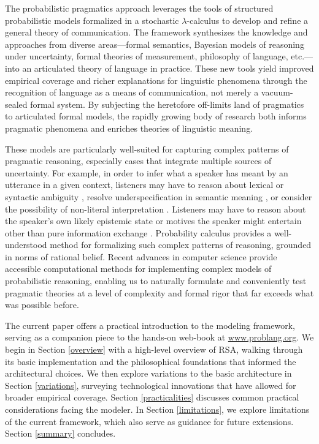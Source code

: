 \documentclass{sp}
\newcommand{\gcs}[1]{\textcolor{blue}{[gcs: #1]}}
\newcommand{\mht}[1]{\textcolor{purple}{[mht: #1]}}
\begin{document}
The probabilistic pragmatics approach leverages the tools of structured probabilistic models formalized in a stochastic $\lambda$-calculus to develop and refine a general theory of communication. The framework synthesizes the knowledge and approaches from diverse areas---formal semantics, Bayesian models of reasoning under uncertainty, formal theories of measurement, philosophy of language, etc.---into an articulated theory of language in practice. These new tools yield improved 
empirical coverage and richer explanations for linguistic phenomena through the recognition of language as a means of communication, not merely a vacuum-sealed formal system. By subjecting the heretofore off-limits land of pragmatics to articulated formal models, the rapidly growing body of research both informs pragmatic phenomena and enriches theories of linguistic meaning.


These models are particularly well-suited for capturing complex patterns of pragmatic reasoning, especially cases that integrate multiple sources of uncertainty. For example, in order to infer what a speaker has meant by an utterance in a given context, listeners may have to reason about lexical or syntactic ambiguity \citep{bergenetal2016,savinellietal2017}, resolve underspecification in semantic meaning \citep{lassitergoodman2013}, or consider the possibility of non-literal interpretation \citep{kaoetal2014}. Listeners may have to reason about the speaker's own likely epistemic state \citep{goodmanstuhlmuller2013,scontrasgoodman2017} or motives the speaker might entertain other than pure  information exchange \citep{yoonetal2016,yoonetal2017}. Probability calculus provides a well-understood method for formalizing such complex patterns of reasoning, grounded in norms of rational belief. Recent advances in computer science provide accessible computational methods for implementing complex models of probabilistic reasoning, enabling us to naturally formulate and conveniently test pragmatic theories at a level of complexity and formal rigor that far exceeds what was possible before.

The current paper offers a practical introduction to the modeling framework, serving as a companion piece to the hands-on web-book at \href{https://www.problang.org}{www.problang.org}. We begin in Section \ref{overview} with a high-level overview of RSA, walking through its basic implementation and the philosophical foundations that informed the architectural choices. We then explore variations to the basic architecture in Section \ref{variations}, surveying technological innovations that have allowed for broader empirical coverage. Section \ref{practicalities} discusses common practical considerations facing the modeler. In Section \ref{limitations}, we explore limitations of the current framework, which also serve as guidance for future extensions. Section \ref{summary} concludes.
\end{document}
